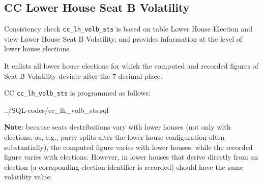 \subsection{CC Lower House Seat B Volatility}\label{cc_lh_volb_sts}
Consistency check \texttt{\footnotesize cc\_lh\_volb\_sts} is based on table Lower House Election and view Lower House Seat B Volatility, and provides information at the level of lower house elections.

It enlists all lower house elections for which the computed and recorded figures of Seat B Volatility deviate after the 7  decimal place.

CC \texttt{\footnotesize cc\_lh\_volb\_sts} is programmed as follows:

%
{../SQL-codes/cc_lh_volb_sts.sql}

{\bf Note}: because seats destributions vary with lower houses (not only with elections, as, e.g., party splits alter the lower house configuration often substantially), the computed figure varies with lower houses, while the recorded figure varies with elections. However, in lower houses that derive directly from an election (a corrsponding election identifier is recorded) should have the same volatility value.

